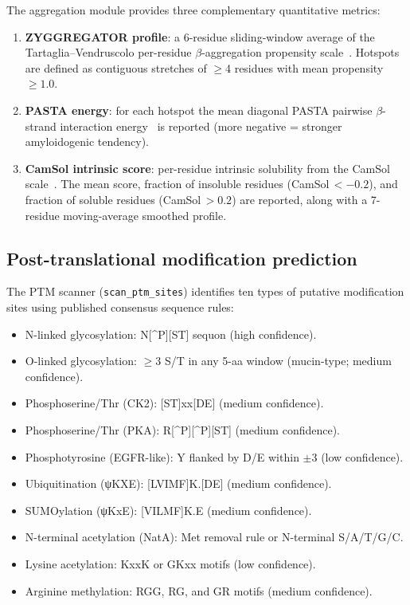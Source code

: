 \documentclass[12pt]{article}
\begin{document}
The aggregation module provides three complementary quantitative metrics:

\begin{enumerate}[noitemsep]
  \item \textbf{ZYGGREGATOR profile}: a 6-residue sliding-window average of
        the Tartaglia--Vendruscolo per-residue $\beta$-aggregation propensity
        scale~\citep{tartaglia2008}.
        Hotspots are defined as contiguous stretches of $\geq$4 residues with
        mean propensity $\geq 1.0$.
  \item \textbf{PASTA energy}: for each hotspot the mean diagonal PASTA pairwise
        $\beta$-strand interaction energy~\citep{trovato2007} is reported
        (more negative = stronger amyloidogenic tendency).
  \item \textbf{CamSol intrinsic score}: per-residue intrinsic solubility from
        the CamSol scale~\citep{sormanni2015}.
        The mean score, fraction of insoluble residues (CamSol\,$< -0.2$),
        and fraction of soluble residues (CamSol\,$> 0.2$) are reported, along
        with a 7-residue moving-average smoothed profile.
\end{enumerate}

\subsection{Post-translational modification prediction}

The PTM scanner (\texttt{scan\_ptm\_sites}) identifies ten types of
putative modification sites using published consensus sequence rules:

\begin{itemize}[noitemsep]
  \item N-linked glycosylation: N[^P][ST] sequon (high confidence).
  \item O-linked glycosylation: $\geq$3 S/T in any 5-aa window (mucin-type;
        medium confidence).
  \item Phosphoserine/Thr (CK2): [ST]xx[DE] (medium confidence).
  \item Phosphoserine/Thr (PKA): R[^P][^P][ST] (medium confidence).
  \item Phosphotyrosine (EGFR-like): Y flanked by D/E within $\pm$3
        (low confidence).
  \item Ubiquitination (ψKXE): [LVIMF]K.[DE] (medium confidence).
  \item SUMOylation (ψKxE): [VILMF]K.E (medium confidence).
  \item N-terminal acetylation (NatA): Met removal rule or N-terminal S/A/T/G/C.
  \item Lysine acetylation: KxxK or GKxx motifs (low confidence).
  \item Arginine methylation: RGG, RG, and GR motifs (medium confidence).
\end{itemize}
\end{document}
